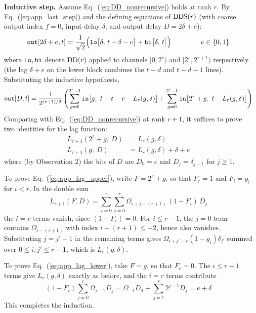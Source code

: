 \documentclass{article}
\numberwithin{equation}{section}   %
\def\DDS{{\rm DDS}}
\def\DD{{\rm DD}}
\begin{document}
\par\noindent
{\bf Inductive step.}
Assume Eq.\ (\ref{eq:DD_nonrecursive}) holds at rank $r$. By Eq.\ (\ref{eq:app_last_step}) and
the defining equations of $\DDS(r)$ (with coarse output index $f=0$, input delay $\delta$, and
output delay $D = 2\delta + e$):
\begin{equation}
{\tt out}[2\delta+e, t] = \frac{1}{\sqrt{2}}
  \Big( {\tt lo}\big[\delta,\, t - \delta - e\big] + {\tt hi}\big[\delta,\, t\big] \Big)
  \hspace{1.5cm} e \in \{0,1\}
\end{equation}
where ${\tt lo}, {\tt hi}$ denote $\DD(r)$ applied to channels $[0, 2^r)$ and $[2^r, 2^{r+1})$
respectively (the lag $\delta + e$ on the lower block combines the $t-d$ and $t-d-1$ lines).
Substituting the inductive hypothesis,
\begin{equation}
{\tt out}[D, t] = \frac{1}{2^{(r+1)/2}} \left(
  \sum_{g=0}^{2^r-1} {\tt in}\big[g,\ t - \delta - e - L_r(g,\delta)\big]
  + \sum_{g=0}^{2^r-1} {\tt in}\big[2^r + g,\ t - L_r(g,\delta)\big] \right)
\end{equation}
Comparing with Eq.\ (\ref{eq:DD_nonrecursive}) at rank $r+1$, it suffices to prove two
identities for the lag function:
\begin{align}
L_{r+1}(2^r + g,\ D) &= L_r(g, \delta)  \label{eq:app_lag_upper} \\
L_{r+1}(g,\ D) &= L_r(g, \delta) + \delta + e  \label{eq:app_lag_lower}
\end{align}
where (by Observation 2) the bits of $D$ are $D_0 = e$ and $D_j = \delta_{j-1}$ for $j \ge 1$.

To prove Eq.\ (\ref{eq:app_lag_upper}), write $F = 2^r + g$, so that $F_r = 1$ and $F_i = g_i$
for $i < r$. In the double sum
\begin{equation}
L_{r+1}(F, D) = \sum_{i=0}^{r} \sum_{j=0}^{r} \Omega_{i+j-(r+1)} \, (1 - F_i) \, D_j
\end{equation}
the $i=r$ terms vanish, since $(1 - F_r) = 0$. For $i \le r-1$, the $j=0$ term contains
$\Omega_{i-(r+1)}$ with index $i-(r+1) \le -2$, hence also vanishes. Substituting $j = j'+1$ in
the remaining terms gives $\Omega_{i+j'-r} (1-g_i) \delta_{j'}$ summed over
$0 \le i, j' \le r-1$, which is $L_r(g, \delta)$.

To prove Eq.\ (\ref{eq:app_lag_lower}), take $F = g$, so that $F_r = 0$. The $i \le r-1$ terms
give $L_r(g,\delta)$ exactly as before, and the $i = r$ terms contribute
\begin{equation}
(1 - F_r) \sum_{j=0}^{r} \Omega_{j-1} D_j
 = \Omega_{-1} D_0 + \sum_{j=1}^{r} 2^{j-1} D_j = e + \delta
\end{equation}
This completes the induction.
\end{document}
